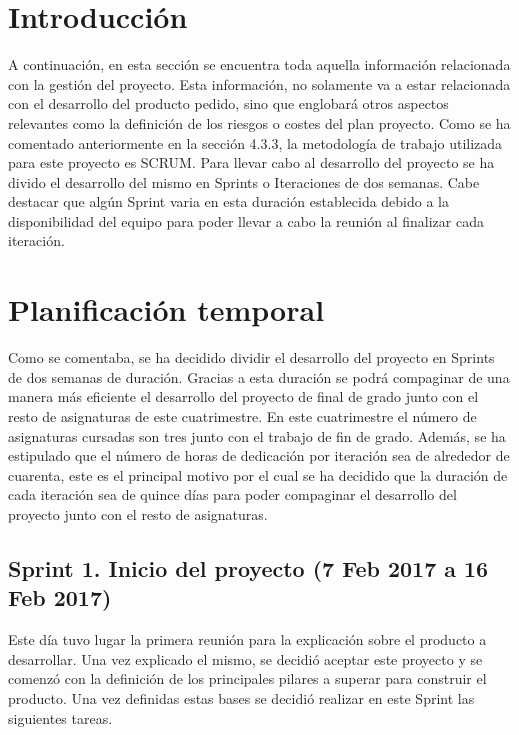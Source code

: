 
\section{Introducción}

A continuación, en esta sección se encuentra toda aquella información relacionada con la gestión del proyecto. Esta información, no solamente va a estar relacionada con el desarrollo del producto pedido, sino que englobará otros aspectos relevantes como la definición de los riesgos o costes del plan proyecto.
Como se ha comentado anteriormente en la sección 4.3.3, la metodología de trabajo utilizada para este proyecto es SCRUM. Para llevar cabo al desarrollo del proyecto se ha divido el desarrollo del mismo en Sprints o Iteraciones de dos semanas. Cabe destacar que algún Sprint varia en esta duración establecida debido a la disponibilidad del equipo para poder llevar a cabo la reunión al finalizar cada iteración.


\section{Planificación temporal}

Como se comentaba, se ha decidido dividir el desarrollo del proyecto en Sprints de dos semanas de duración. Gracias a esta duración se podrá compaginar de una manera más eficiente el desarrollo del proyecto de final de grado junto con el resto de asignaturas de este cuatrimestre. En este cuatrimestre el número de asignaturas cursadas son tres junto con el trabajo de fin de grado. Además, se ha estipulado que el número de horas de dedicación por iteración sea de alrededor de cuarenta, este es el principal motivo por el cual se ha decidido que la duración de cada iteración sea de quince días para poder compaginar el desarrollo del proyecto junto con el resto de asignaturas.

\subsection{Sprint 1. Inicio del proyecto (7 Feb 2017 a 16 Feb 2017)}

Este día tuvo lugar la primera reunión para la explicación sobre el producto a desarrollar. Una vez explicado el mismo, se decidió aceptar este proyecto y se comenzó con la definición de los principales pilares a superar para construir el producto. Una vez definidas estas bases se decidió realizar en este Sprint las siguientes tareas.

